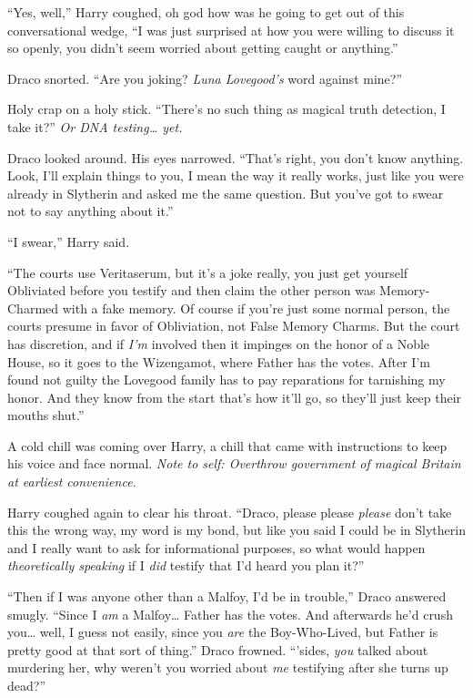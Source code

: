 ``Yes, well,'' Harry coughed, oh god how was he going to get out of this
conversational wedge, ``I was just surprised at how you were willing to
discuss it so openly, you didn't seem worried about getting caught or
anything.''

Draco snorted. ``Are you joking? \emph{Luna Lovegood's} word against
mine?''

Holy crap on a holy stick. ``There's no such thing as magical truth
detection, I take it?'' \emph{Or DNA testing\ldots{} yet.}

Draco looked around. His eyes narrowed. ``That's right, you don't know
anything. Look, I'll explain things to you, I mean the way it really
works, just like you were already in Slytherin and asked me the same
question. But you've got to swear not to say anything about it.''

``I swear,'' Harry said.

``The courts use Veritaserum, but it's a joke really, you just get
yourself Obliviated before you testify and then claim the other person
was Memory-Charmed with a fake memory. Of course if you're just some
normal person, the courts presume in favor of Obliviation, not False
Memory Charms. But the court has discretion, and if \emph{I'm} involved
then it impinges on the honor of a Noble House, so it goes to the
Wizengamot, where Father has the votes. After I'm found not guilty the
Lovegood family has to pay reparations for tarnishing my honor. And they
know from the start that's how it'll go, so they'll just keep their
mouths shut.''

A cold chill was coming over Harry, a chill that came with instructions
to keep his voice and face normal. \emph{Note to self: Overthrow
government of magical Britain at earliest convenience.}

Harry coughed again to clear his throat. ``Draco, please please
\emph{please} don't take this the wrong way, my word is my bond, but
like you said I could be in Slytherin and I really want to ask for
informational purposes, so what would happen \emph{theoretically
speaking} if I \emph{did} testify that I'd heard you plan it?''

``Then if I was anyone other than a Malfoy, I'd be in trouble,'' Draco
answered smugly. ``Since I \emph{am} a Malfoy\ldots{} Father has the
votes. And afterwards he'd crush you\ldots{} well, I guess not easily,
since you \emph{are} the Boy-Who-Lived, but Father is pretty good at
that sort of thing.'' Draco frowned. ``'sides, \emph{you} talked about
murdering her, why weren't you worried about \emph{me} testifying after
she turns up dead?''

